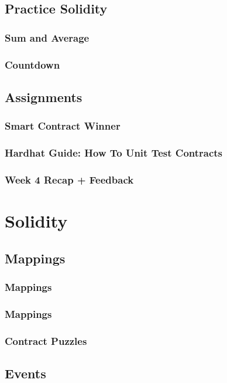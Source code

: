 \documentclass[a4paper, oneside]{book}
\begin{document}
\section{Practice Solidity}
\subsection{Sum and Average}
\subsection{Countdown}

\section{Assignments}
\subsection{Smart Contract Winner}
\subsection{Hardhat Guide: How To Unit Test Contracts}
\subsection{Week 4 Recap + Feedback}


\chapter{Solidity}

\section{Mappings}
\subsection{Mappings}
\subsection{Mappings}
\subsection{Contract Puzzles}

\section{Events}
\end{document}
